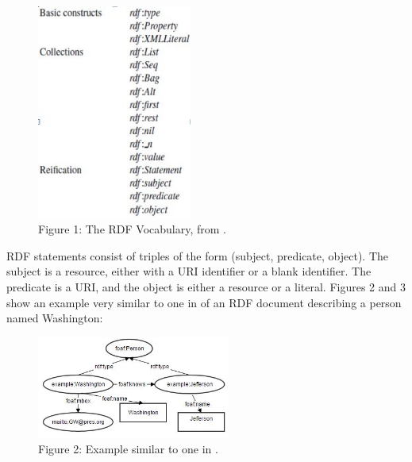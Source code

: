 \documentclass[10pt,journal,compsoc]{IEEEtran}
\begin{document}
\vspace{3mm}
\begin{figure}[htbp] %
   \centering
   \includegraphics[width=2in]{RDFVocabPic.jpg} 
\caption*{Figure 1: The RDF Vocabulary, from \cite{_social_2007}.}
   \label{}
\label{}   
\end{figure}

\vspace{3mm}
RDF statements consist of triples of the form (subject, predicate, object).  The subject is a resource, either with a URI identifier or a blank identifier.  The predicate is a URI, and the object is either a resource or a literal. Figures 2 and 3 show an example very similar to one in \cite{_social_2007} of an RDF document describing a person named Washington: 

\begin{figure}[h] %
   \centering
   \includegraphics[width=2.5in]{WashJeffPic.jpg} 
\caption*{Figure 2: Example similar to one in \cite{_social_2007}.}
   \label{}
\label{}   
\end{figure}
\end{document}
